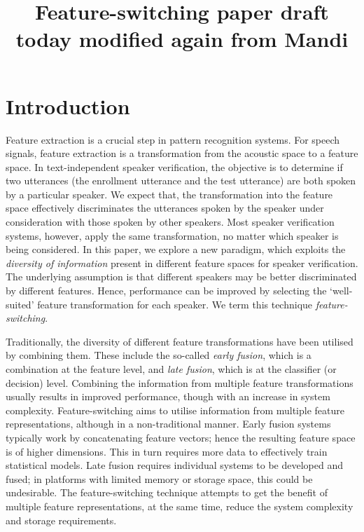\documentclass{article}
\title{Feature-switching paper draft today modified again from Mandi}
\begin{document}
\section{Introduction}
\label{sec:intro}
Feature extraction is a crucial step in pattern recognition systems. For
speech signals, feature extraction is a transformation from the acoustic space
to a feature space. In text-independent speaker verification, the objective is
to determine if two utterances (the enrollment utterance and the test utterance) are
both spoken by a particular speaker. We expect that, the transformation into the
feature space effectively discriminates the utterances spoken by the speaker
under consideration with those spoken by other speakers. Most speaker
verification systems, however, apply the same transformation, no matter which
speaker is being considered. In this paper, we explore a new paradigm, which
exploits the \emph{diversity of information} present in different feature spaces
for speaker verification. The underlying assumption is that different speakers
may be better discriminated by different features. Hence, performance can
be improved by selecting the `well-suited' feature transformation for
each speaker. We term this technique \emph{feature-switching}. 

Traditionally, the diversity of different feature transformations have been
utilised by combining them. These include the so-called \emph{early fusion},
which is a combination at the feature level, and \emph{late fusion}, which is at
the classifier (or decision) level. Combining the information from multiple
feature transformations usually results in improved performance, though
with an increase in system complexity. Feature-switching aims to utilise
information from multiple feature representations, although in a non-traditional
manner. Early fusion systems typically work by concatenating feature vectors;
hence the resulting feature space is of higher dimensions. This in turn requires
more data to effectively train statistical models. Late fusion requires
individual systems to be developed and fused; in platforms with limited memory or
storage space, this could be undesirable. The feature-switching technique
attempts to get the benefit of multiple feature representations, at the same
time, reduce the system complexity and storage requirements.
\end{document}
